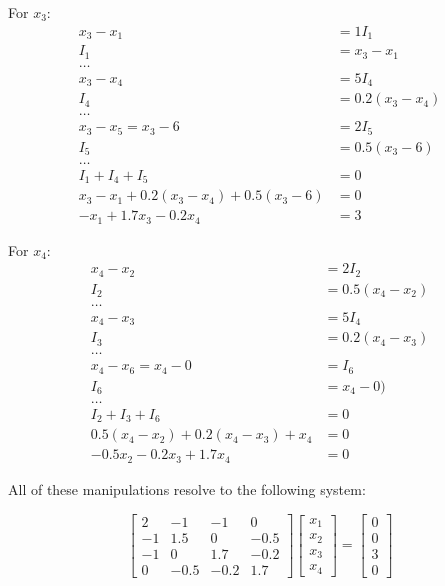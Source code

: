 \documentclass[10pt]{article}
\begin{document}
    For \begin{math} x_3 \end{math}:
    \begin{align}
        x_3 - x_1 &= 1I_1 \\
        I_1 &= x_3 - x_1 \\
        \dots \\
        x_3 - x_4 &= 5I_4 \\
        I_4 &= 0.2(x_3 - x_4) \\
        \dots \\
        x_3 - x_5 = x_3 - 6 &= 2I_5 \\
        I_5 &= 0.5(x_3 - 6) \\
        \dots \\
        I_1 + I_4 + I_5 &= 0 \\
        x_3 - x_1 +  0.2(x_3 - x_4) + 0.5(x_3 - 6) &= 0 \\
        -x_1 + 1.7x_3 - 0.2x_4 &= 3
    \end{align}

    For \begin{math} x_4 \end{math}:
    \begin{align}
        x_4 - x_2 &= 2I_2 \\
        I_2 &= 0.5(x_4 - x_2) \\
        \dots \\
        x_4 - x_3 &= 5I_4 \\
        I_3 &= 0.2(x_4 - x_3) \\
        \dots \\
        x_4 - x_6 = x_4 - 0 &= I_6 \\
        I_6 &= x_4 - 0) \\
        \dots \\
        I_2 + I_3 + I_6 &= 0 \\
        0.5(x_4 - x_2) +  0.2(x_4 - x_3) + x_4 &= 0 \\
        -0.5x_2 - 0.2x_3 + 1.7x_4 &= 0
    \end{align}

    All of these manipulations resolve to the following system:

    \begin{equation}
        \begin{bmatrix}
            2 & -1 & -1 & 0 \\
            -1 & 1.5 & 0 & -0.5 \\
            -1 & 0 & 1.7 & -0.2 \\
            0 & -0.5 & -0.2 & 1.7
        \end{bmatrix}
        \begin{bmatrix}
            x_1 \\ x_2 \\ x_3 \\ x_4
        \end{bmatrix} =
        \begin{bmatrix}
            0 \\ 0 \\ 3 \\ 0
        \end{bmatrix}
        \label{eq:circuit_1_system}
    \end{equation}
\end{document}

